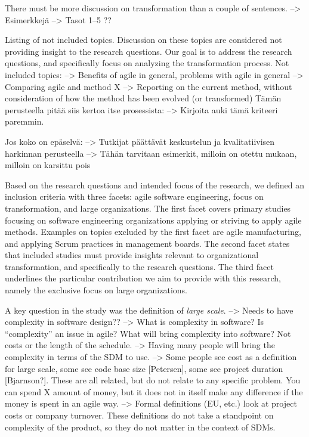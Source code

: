 \documentclass[preprint,authoryear,12pt]{elsarticle}
\begin{document}
There must be more discussion on transformation than a couple of sentences.
--> Esimerkkejä
--> Tasot 1--5 ??

Listing of not included topics. Discussion on these topics are considered not
providing insight to the research questions. Our goal is to address the research
questions, and specifically focus on analyzing the transformation process.
Not included topics:
--> Benefits of agile in general, problems with agile in general
--> Comparing agile and method X
--> Reporting on the current method, without consideration of how the method has
    been evolved (or transformed)
Tämän perusteella pitää siis kertoa itse prosessista: --> Kirjoita auki tämä
kriteeri paremmin.


Jos koko on epäselvä:
--> Tutkijat päättävät keskustelun ja kvalitatiivisen harkinnan perusteella
--> Tähän tarvitaan esimerkit, milloin on otettu mukaan, milloin on karsittu
    pois




Based on the research questions and intended focus of the research, we defined
an inclusion criteria with three facets: agile software engineering, focus on
transformation, and large organizations. The first facet covers primary studies
focusing on software engineering organizations applying or striving to apply
agile methods. Examples on topics excluded by the first facet are agile
manufacturing, and applying Scrum practices in management boards. The second
facet states that included studies must provide insights relevant to
organizational transformation, and specifically to the research questions.
The third facet underlines the particular contribution we aim to provide with
this research, namely the exclusive focus on large organizations.

A key question in the study was the definition of \emph{large scale}.
--> Needs to have complexity in software design?? --> What is complexity in software?
    Is ``complexity'' an issue in agile?
    What will bring complexity into software? Not costs or the length of the
    schedule. --> Having many people will bring the complexity in terms of the
    SDM to use.
--> Some people see cost as a definition for large scale, some see code base
    size [Petersen], some see project duration [Bjarnson?]. These are all
    related, but do not relate to any specific problem. You can spend X amount
    of money, but it does not in itself make any difference if the money is
    spent in an agile way.
--> Formal definitions (EU, etc.) look at project costs or company turnover.
    These definitions do not take a standpoint on complexity of the product, so
    they do not matter in the context of SDMs.
\end{document}
